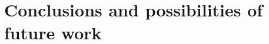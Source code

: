 \chapter[Conclusions and possibilities of future work]{Conclusions and possibilities of future work}\label{chapter:conclusions}

